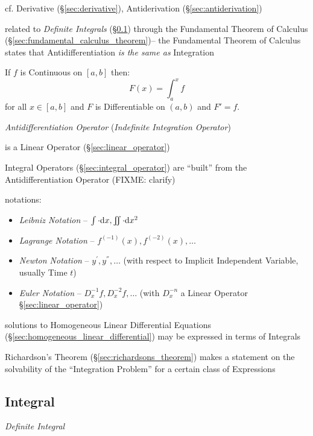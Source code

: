 \fist cf. Derivative (\S\ref{sec:derivative}), Antiderivation
(\S\ref{sec:antiderivation})

\fist related to \emph{Definite Integrals} (\S\ref{sec:integral}) through the
Fundamental Theorem of Calculus (\S\ref{sec:fundamental_calculus_theorem})-- the
Fundamental Theorem of Calculus states that Antidifferentiation \emph{is the
  same as} Integration

If $f$ is Continuous on $[a,b]$ then:
\[
  F(x) = \int_a^x f
\]
for all $x \in [a,b]$ and $F$ is Differentiable on $(a,b)$ and $F' = f$.

\emph{Antidifferentiation Operator} (\emph{Indefinite Integration Operator})

is a Linear Operator (\S\ref{sec:linear_operator})

\fist Integral Operators (\S\ref{sec:integral_operator}) are ``built'' from the
Antidifferentiation Operator (FIXME: clarify)

notations:
\begin{itemize}
  \item \emph{Leibniz Notation} --
    $\int \cdot \mathrm{d}x, \iint \cdot \mathrm{d}x^2$
  \item \emph{Lagrange Notation} -- $f^{(-1)}(x), f^{(-2)}(x), \ldots$
  \item \emph{Newton Notation} -- $y^{'}, y^{''}, \ldots$ (with respect
    to Implicit Independent Variable, usually Time $t$)
  \item \emph{Euler Notation} -- $D^{-1}_x{f}, D^{-2}_x{f}, \ldots$ (with
    $D_x^{-n}$ a Linear  Operator \S\ref{sec:linear_operator})
\end{itemize}

solutions to Homogeneous Linear Differential Equations
(\S\ref{sec:homogeneous_linear_differential}) may be expressed in
terms of Integrals

Richardson's Theorem (\S\ref{sec:richardsons_theorem}) makes a statement on the
solvability of the ``Integration Problem'' for a certain class of Expressions



\subsection{Integral}\label{sec:integral}

\emph{Definite Integral}


